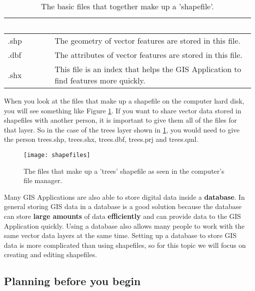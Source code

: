 \begin{table}[ht]
\centering
\caption{The basic files that together make up a 'shapefile'.}\medskip
 \label{tab:shapefile}
 \begin{tabular}{|p{3cm}|p{13cm}|}
 \hline
 \rowcolor{black}
 \textcolor{white}{\textbf{Extension}} &
 \textcolor{white}{\textbf{Description}} \\
 \hline .shp & The geometry of vector features are stored in this file. \\
 \hline .dbf & The attributes of vector features are stored in this file. \\
 \hline .shx & This file is an index that helps the GIS Application to find
features more quickly. \\
\hline
\end{tabular}
\end{table}

When you look at the files that make up a shapefile on the computer hard
disk, you will see something like Figure \ref{fig:shapefiles}. If you want to share
vector data stored in shapefiles with another person, it is important to give
them all of the files for that layer. So in the case of the trees layer shown
in \ref{fig:shapefiles}, you would need to give the person trees.shp,
trees.shx, trees.dbf, trees.prj and trees.qml.

\begin{figure}[ht]
   \begin{center}
   \caption{The files that make up a 'trees' shapefile as seen in the
computer's file manager.}
\label{fig:shapefiles}\smallskip
   \texttt{[image: shapefiles]}
\end{center}
\end{figure}

Many GIS Applications are also able to store digital data inside a
\textbf{database}.
In general storing GIS data in a database is a good solution because the
database can store \textbf{large amounts} of data \textbf{efficiently} and
can provide data to
the GIS Application quickly. Using a database also allows many people to work
with the same vector data layers at the same time. Setting up a database to
store GIS data is more complicated than using shapefiles, so for this topic
we will focus on creating and editing shapefiles.

\subsection{Planning before you begin}

